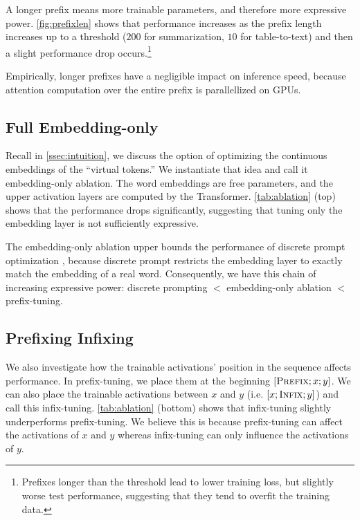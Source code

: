 A longer prefix means more trainable parameters, and therefore more expressive power. 
\ref{fig:prefixlen} shows that performance increases as the prefix length increases up to a threshold ($200$ for summarization, $10$ for table-to-text) and then a slight performance drop occurs.\footnote{Prefixes longer than the threshold lead to lower training loss, but slightly worse test performance, suggesting that they tend to overfit the training data.}

Empirically, longer prefixes have a negligible impact on inference speed, because attention computation over the entire prefix is parallellized on GPUs. 

\subsection{Full \@vs Embedding-only}
\label{ssec:embed_only}

Recall in \ref{ssec:intuition}, we discuss the option of optimizing the continuous embeddings of the ``virtual tokens.'' We instantiate that idea and call it embedding-only ablation. The word embeddings are free parameters, and the upper activation layers are computed by the Transformer. \ref{tab:ablation} (top) shows that the performance drops significantly, suggesting that tuning only the embedding layer is not sufficiently expressive. 

The embedding-only ablation upper bounds the performance of discrete prompt optimization \cite{shin2020autoprompt}, because discrete prompt restricts the embedding layer to exactly match the embedding of a real word. Consequently, we have this chain of increasing expressive power: discrete prompting $<$ embedding-only ablation $<$ prefix-tuning. 

\subsection{Prefixing \@vs Infixing}
\label{ssec:infixing}
We also investigate how the trainable activations' position in the sequence affects performance. In prefix-tuning, we place them at the beginning $[\textsc{Prefix} ; x ; y]$. We can also place the trainable activations between $x$ and $y$ (i.e. $[x;\textsc{Infix};y]$) and call this infix-tuning. \ref{tab:ablation} (bottom) shows that infix-tuning slightly underperforms prefix-tuning. We believe this is because prefix-tuning can affect the activations of $x$ and $y$ whereas infix-tuning can only influence the activations of $y$. 

